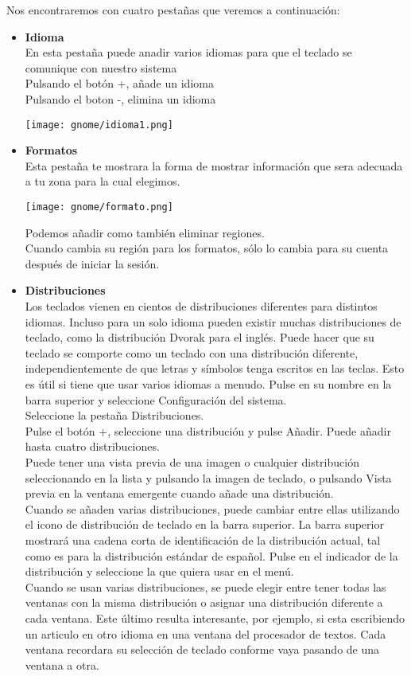 Nos encontraremos con cuatro pestañas que veremos a continuación:
\begin{itemize}
	\item {\large \bf Idioma}\\
	En esta pestaña puede anadir varios idiomas para que el teclado se comunique con nuestro sistema\\
    Pulsando el botón +, añade un idioma\\
    Pulsando el boton -, elimina un idioma
\begin{center}
\texttt{[image: gnome/idioma1.png]} 
\end{center}
	\item {\large \bf Formatos}\\
		Esta pestaña te mostrara la forma de mostrar información que sera adecuada a tu zona para la cual elegimos.
\begin{center}
\texttt{[image: gnome/formato.png]} 
\end{center}
Podemos añadir como también eliminar regiones.\\ 
		Cuando cambia su región para los formatos, sólo lo cambia para su cuenta después de iniciar la sesión.
	\item {\large \bf Distribuciones}\\
	Los teclados vienen en cientos de distribuciones diferentes para distintos idiomas. Incluso para un solo idioma pueden existir muchas distribuciones de teclado, como la distribución Dvorak para el inglés. Puede hacer que su teclado se comporte como un teclado con una distribución diferente, independientemente de que letras y símbolos tenga escritos en las teclas. Esto es útil si tiene que usar varios idiomas a menudo.
Pulse en su nombre en la barra superior y seleccione Configuración del sistema.\\

Seleccione la pestaña Distribuciones.\\
Pulse el botón +, seleccione una distribución y pulse Añadir. Puede añadir hasta cuatro distribuciones.\\
Puede tener una vista previa de una imagen o cualquier distribución seleccionando en la lista y pulsando la imagen de teclado, o pulsando Vista previa en la ventana emergente cuando añade una distribución.\\
Cuando se añaden varias distribuciones, puede cambiar entre ellas utilizando el icono de distribución de teclado en la barra superior. La barra superior mostrará una cadena corta de identificación de la distribución actual, tal como es para la distribución estándar de español. Pulse en el indicador de la distribución y seleccione la que quiera usar en el menú.\\
Cuando se usan varias distribuciones, se puede elegir entre tener todas las ventanas con la misma distribución o asignar una distribución diferente a cada ventana. Este último resulta interesante, por ejemplo, si esta escribiendo un articulo en otro idioma en una ventana del procesador de textos. Cada ventana recordara su selección de teclado conforme vaya pasando de una ventana a otra.\\


\end{itemize}
